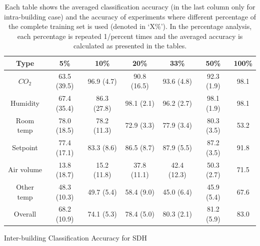 \begin{table}[ht!]
\centering %
\begin{tabular}{c | c | c | c | c | c | c} \hline
Type & 5\% & 10\% & 20\% & 33\% & 50\% & 100\%\\ %
\hline\hline %
$CO_{2}$ & 63.5 (39.5) & 96.9 (4.7) & 90.8 (16.5) & 93.6 (4.8) & 92.3 (1.9) & 98.1\\ \hline
Humidity & 67.4 (35.4) & 86.3 (27.8) & 98.1 (2.1) & 96.2 (2.7) & 98.1 (1.9) & 98.1\\ \hline
Room temp & 78.0 (18.5) & 78.2 (11.3) & 72.9 (3.3) & 77.9 (3.4) & 80.3 (3.5) & 53.2\\ \hline
Setpoint & 77.4 (17.1) & 83.3 (8.6) & 86.5 (8.7) & 87.9 (5.5) & 87.2 (3.5) & 91.8\\ \hline
Air volume & 13.8 (18.7) & 15.2 (11.8) & 37.8 (11.1) & 42.4 (12.3) & 50.3 (2.7) & 71.5\\ \hline
Other temp & 48.3 (10.3) & 49.7 (5.4) & 58.4 (9.0) & 45.0 (6.4) & 45.9 (5.4) & 67.6\\ \hline
Overall & 68.2 (10.9) & 74.1 (5.3) & 78.4 (5.0) & 80.3 (2.1) & 81.2 (5.9) & 83.0\\ \hline
\end{tabular}
\caption{Inter-building Classification Accuracy for SDH}
\caption*{Each table shows the averaged classification accuracy (in the last column only for intra-building case) and the accuracy of experiments where different percentage of the complete training set is used (denoted in `X\%'). In the percentage analysis, each percentage is repeated 1/percent times and the averaged accuracy is calculated as presented in the tables.}
\label{table:sdh_x} %
\end{table}

